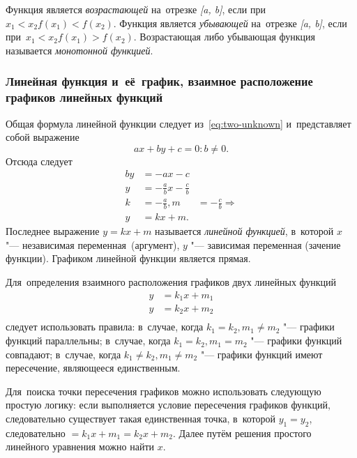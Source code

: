 \documentclass[]{scrartcl}
\begin{document}
Функция является \emph{возрастающей} на~отрезке \textit{[a, b]}, если при~$x_1 < x_2 f(x_1) < f(x_2)$. Функция является \emph{убывающей} на~отрезке \textit{[a, b]}, если при~$x_1 < x_2 f(x_1) > f(x_2)$. Возрастающая либо убывающая функция называется \emph{монотонной функцией}.

\subsubsection{Линейная функция и~её~график, взаимное расположение графиков линейных функций}

Общая формула линейной функции следует из~\ref{eq:two-unknown} и~представляет собой выражение
\begin{equation}\label{eq:linear-func-1}
ax+by+c=0: b\neq 0.
\end{equation}
Отсюда следует
\begin{equation}\label{eq:linear-func-2}
	\begin{aligned}
		by &= -ax-c\\
		y &= -\frac{a}{b}x - \frac{c}{b}\\
		k &= -\frac{a}{b}, m &= -\frac{c}{b} \Rightarrow \\
		y &= kx+m. 
	\end{aligned}
\end{equation}
Последнее выражение $y=kx+m$ называется \emph{линейной функцией}, в~которой $x$ "--- независимая переменная~(аргумент), $y$ "--- зависимая переменная (зачение функции). Графиком линейной функции является прямая.

Для~определения взаимного расположения графиков двух линейных функций
\begin{equation*}\label{eq:linear-func-3}
\begin{aligned}
y&=k_{1}x+m_1\\
y&=k_{2}x+m_2\\
\end{aligned}
\end{equation*}
следует использовать правила: в~случае, когда $k_1=k_2, m_1 \neq m_2$ "--- графики функций параллельны; в~случае, когда $k_1=k_2, m_1=m_2$ "--- графики функций совпадают; в~случае, когда $k_1 \neq k_2, m_1 \neq m_2$ "--- графики функций имеют пересечение, являющееся единственным. 

Для~поиска точки пересечения графиков можно использовать следующую простую логику: если выполняется условие пересечения графиков функций, следовательно существует такая единственная точка, в~которой $y_1=y_2$, следовательно $=k_{1}x+m_1 = k_{2}x+m_2$. Далее путём решения простого линейного уравнения можно найти $x$.
\end{document}
